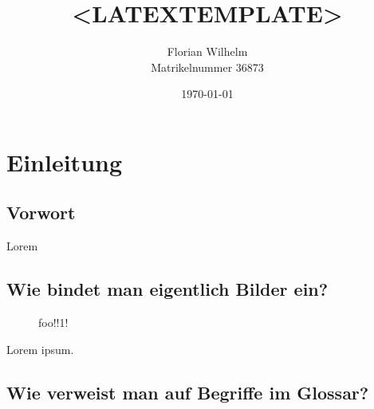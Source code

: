 \documentclass[11pt,a4paper,titlepage,ngerman]{article}
\begin{document}
\begin{titlepage}
\title{<LATEXTEMPLATE>}
\author{Florian Wilhelm\\Matrikelnummer 36873}
\date{\today}
\maketitle
\end{titlepage}

\tableofcontents
\newpage

\section{Einleitung}

\subsection{Vorwort}

Lorem

\subsection{Wie bindet man eigentlich Bilder ein?}

\begin{figure}[htbp]
  \centering
  \caption{foo!!1! }
  \label{footo}
\end{figure}

Lorem ipsum.

\subsection{Wie verweist man auf Begriffe im Glossar?}
\end{document}
